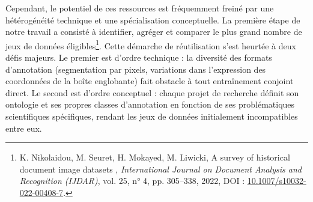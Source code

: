 Cependant, le potentiel de ces ressources est fréquemment freiné par une hétérogénéité technique et une spécialisation conceptuelle. La première étape de notre travail a consisté à identifier, agréger et comparer le plus grand nombre de jeux de données éligibles\footnote{K. Nikolaidou, M. Seuret, H. Mokayed, M. Liwicki, \og A survey of historical document image datasets \fg, \textit{International Journal on Document Analysis and Recognition (IJDAR)}, vol. 25, n° 4, pp. 305–338, 2022, DOI : \href{https://doi.org/10.1007/s10032-022-00408-7}{10.1007/s10032-022-00408-7}.}. Cette démarche de réutilisation s'est heurtée à deux défis majeurs. Le premier est d'ordre technique : la diversité des formats d'annotation (segmentation par pixels, variations dans l'expression des coordonnées de la boîte englobante) fait obstacle à tout entraînement conjoint direct. Le second est d'ordre conceptuel : chaque projet de recherche définit son ontologie et ses propres classes d'annotation en fonction de ses problématiques scientifiques spécifiques, rendant les jeux de données initialement incompatibles entre eux.

